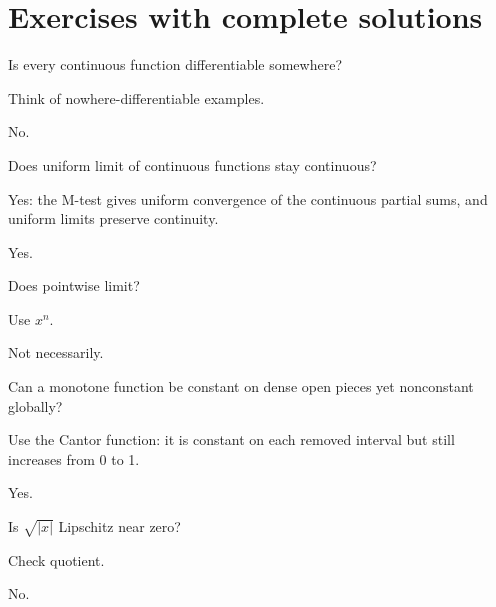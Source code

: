 \section{Exercises with complete solutions}

\begin{exercise}\label{exr:ii15-01}
Is every continuous function differentiable somewhere?
\end{exercise}
\begin{hint}
Think of nowhere-differentiable examples.
\end{hint}
\begin{solution}
No.
\end{solution}

\begin{exercise}\label{exr:ii15-02}
Does uniform limit of continuous functions stay continuous?
\end{exercise}
\begin{hint}
Yes: the M-test gives uniform convergence of the continuous partial sums, and uniform limits preserve continuity.
\end{hint}
\begin{solution}
Yes.
\end{solution}

\begin{exercise}\label{exr:ii15-03}
Does pointwise limit?
\end{exercise}
\begin{hint}
Use $x^n$.
\end{hint}
\begin{solution}
Not necessarily.
\end{solution}

\begin{exercise}\label{exr:ii15-04}
Can a monotone function be constant on dense open pieces yet nonconstant globally?
\end{exercise}
\begin{hint}
Use the Cantor function: it is constant on each removed interval but still increases from 0 to 1.
\end{hint}
\begin{solution}
Yes.
\end{solution}

\begin{exercise}\label{exr:ii15-05}
Is $\sqrt{|x|}$ Lipschitz near zero?
\end{exercise}
\begin{hint}
Check quotient.
\end{hint}
\begin{solution}
No.
\end{solution}

